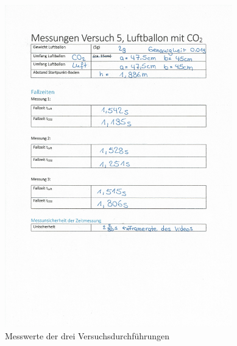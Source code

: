 \documentclass{article}
\begin{document}
      \begin{figure}[!ht]\label{fig:Messwerte}
          \centering
          \includegraphics[height=14cm]{messwerte.jpg}
          \caption{Messwerte der drei Versuchsdurchführungen}
      \end{figure}
\end{document}
